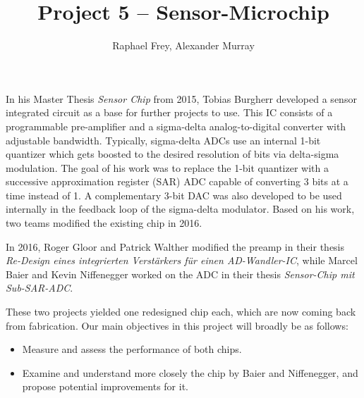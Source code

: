 \documentclass[a4paper,10pt]{article}
\title{Project 5 -- Sensor-Microchip}
\author{Raphael Frey, Alexander Murray}
\affil{Institute for Mikroelektronics\\FHNW -- Hochschule f\"ur Technik\\ Studiengang EIT}
\begin{document}
\maketitle



In his Master Thesis \emph{Sensor Chip}  from  2015, Tobias Burgherr developed a
sensor  integrated  circuit  as  a  base  for  further projects to use. This  IC
consists of a programmable  pre-amplifier  and  a  sigma-delta analog-to-digital
converter with adjustable bandwidth. Typically, sigma-delta ADCs use an internal
1-bit quantizer which gets  boosted  to  the  desired  resolution  of  bits  via
delta-sigma modulation. The goal of his work was to  replace the 1-bit quantizer
with a successive  approximation register (SAR) ADC capable of converting 3 bits
at a time instead of 1. A complementary  3-bit DAC was also developed to be used
internally in the feedback loop of the sigma-delta modulator. Based on his work,
two teams modified the existing chip
in 2016.

In 2016, Roger  Gloor and Patrick Walther modified the  preamp in their thesis
\emph{Re-Design eines  integrierten Verst\"arkers f\"ur  einen AD-Wandler-IC},
while Marcel  Baier and Kevin  Niffenegger worked on  the ADC in  their thesis
\emph{Sensor-Chip mit Sub-SAR-ADC}.

These two projects yielded one redesigned chip each, which are now coming back
from fabrication. Our main objectives in this project will broadly be as follows:

\begin{itemize}
    \item
        Measure and assess the performance of both chips.
    \item
        Examine and understand more closely the chip by Baier and Niffenegger,
        and propose potential improvements for it.
\end{itemize}
\end{document}
